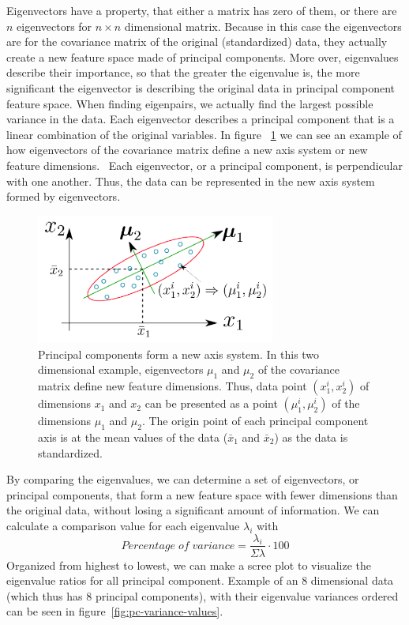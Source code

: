 Eigenvectors have a property,
that either a matrix has zero of them,
or there are $n$ eigenvectors for $n\times n$ dimensional matrix.
Because in this case the eigenvectors are for the covariance matrix of the original (standardized) data,
they actually create a new feature space made of principal components.
More over,
eigenvalues describe their importance,
so that the greater the eigenvalue is,
the more significant the eigenvector is describing the original data
in principal component feature space.
When finding eigenpairs,
we actually find the largest possible variance in the data.
Each eigenvector describes a principal component
that is a linear combination of the original variables.
In figure ~\ref{fig:pca-example} we can see an example of
how eigenvectors of the covariance matrix define a new axis system
or new feature dimensions.~\cite{zhu2019dimension}
Each eigenvector, or a principal component,
is perpendicular with one another.
Thus, the data can be represented
in the new axis system formed by eigenvectors.

\begin{figure}[htb]
    \centering
    \includegraphics[width=0.7\textwidth]{./appendices/pca-example}
    \caption{Principal components form a new axis system.
    In this two dimensional example,
        eigenvectors $\mu_{1}$ and $\mu_{2}$ of the covariance matrix
        define new feature dimensions.
        Thus, data point $(x_{1}^{i},x_{2}^{i})$ of dimensions $x_{1}$ and $x_{2}$
        can be presented as a point $(\mu_{1}^{i},\mu_{2}^{i})$ of the dimensions $\mu_{1}$ and $\mu_{2}$.
        The origin point of each principal component axis is at the mean values of the data ($\bar{x}_{1}$ and $\bar{x}_{2}$)
        as the data is standardized.
        ~\cite{zhu2019dimension}
        \label{fig:pca-example}}
\end{figure}

By comparing the eigenvalues,
we can determine a set of eigenvectors,
or principal components,
that form a new feature space with fewer dimensions than the original data,
without losing a significant amount of information.
We can calculate a comparison value for each eigenvalue $\lambda_{i}$ with
\begin{equation}
    Percentage\; of\; variance = \frac{\lambda_{i}}{\Sigma\lambda}\cdot100
\end{equation}
Organized from highest to lowest,
we can make a scree plot to visualize the eigenvalue ratios
for all principal component.
Example of an 8 dimensional data
(which thus has 8 principal components),
with their eigenvalue variances ordered
can be seen in figure~\ref{fig:pc-variance-values}.

